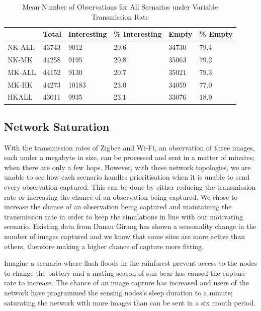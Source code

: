 \begin{table}[h]
\centering
\begin{tabular}{|l|l|l|l|l|l|}
\hline
      & Total & Interesting & \% Interesting & Empty & \% Empty \\
\hline
NK-ALL & 43743 & 9012        & 20.6           & 34730 & 79.4     \\
NK-MK  & 44258 & 9195        & 20.8           & 35063 & 79.2     \\
MK-ALL & 44152 & 9130        & 20.7           & 35021 & 79.3     \\
MK-HK  & 44273 & 10183       & 23.0           & 34059 & 77.0     \\
HKALL & 43011 & 9935        & 23.1           & 33076 & 18.9     \\
\hline
\end{tabular}
\caption{Mean Number of Observations for All Scenarios under Variable Transmission Rate}
\label{sim:tab:variable}
\end{table}

\subsection{Network Saturation}



With the transmission rates of Zigbee and Wi-Fi, an observation of three images, each under a megabyte in size, can be processed and sent in a matter of minutes; when there are only a few hops. However, with these network topologies, we are unable to see how each scenario handles prioritisation when it is unable to send every observation captured. This can be done by either reducing the transmission rate or increasing the chance of an observation being captured. We chose to increase the chance of an observation being captured and maintaining the transmission rate in order to keep the simulations in line with our motivating scenario. Existing data from Danau Girang has shown a seasonality change in the number of images captured and we know that some sites are more active than others, therefore making a higher chance of capture more fitting. 

Imagine a scenario where flash floods in the rainforest prevent access to the nodes to change the battery and a mating season of sun bear has caused the capture rate to increase. The chance of an image capture has increased and users of the network have programmed the sensing nodes's sleep duration to a minute; saturating the network with more images than can be sent in a six month period.

